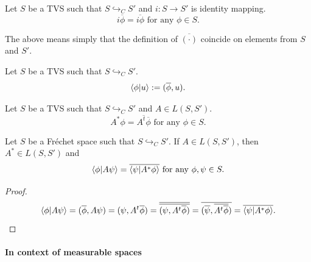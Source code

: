 \documentclass[main.tex]{subfiles}
\begin{document}
\begin{corollary}
Let $S$ be a TVS such that $S \hookrightarrow_C S'$ and $i:S\to S'$ is identity mapping. 
\begin{equation}
i\overline{\phi} = \overline{i\phi} \text{ for any } \phi\in S.
\end{equation}
\end{corollary}

The above means simply that the definition of $\overline{(\cdot)}$ coincide on elements from $S$ and $S'$.

\begin{definition}
Let $S$ be a TVS such that $S \hookrightarrow_C S'$.
\begin{equation}
\braket{\phi}{u} := (\overline{\phi}, u).
\end{equation}
\end{definition}

\begin{definition}
Let $S$ be a TVS such that $S \hookrightarrow_C S'$ and $A\in L(S, S')$.
\begin{equation}
A^* \phi = \overline{A^t \overline{\phi}} \text{ for any } \phi\in S.
\end{equation}
\end{definition}
\begin{theorem}
Let $S$ be a Fr\'echet space such that $S \hookrightarrow_C S'$. If $A\in L(S, S')$, then $A^*\in L(S, S')$ and
\begin{equation}
\braket{\phi}{A\psi} = \overline{\braket{\psi}{A^*\phi}} \text{ for any } \phi,\psi\in S.
\end{equation}
\end{theorem}
\begin{proof}
\begin{equation}
\braket{\phi}{A\psi} = (\overline{\phi}, A\psi) =
(\psi, A^t \overline{\phi}) = \overline{\overline{(\psi, A^t \overline{\phi})}}  =  \overline{(\overline{\psi}, \overline{A^t \overline{\phi}})} = \overline{\braket{\psi}{A^* \phi}}.
\end{equation}
\end{proof}

\paragraph{In context of measurable spaces}
\end{document}
